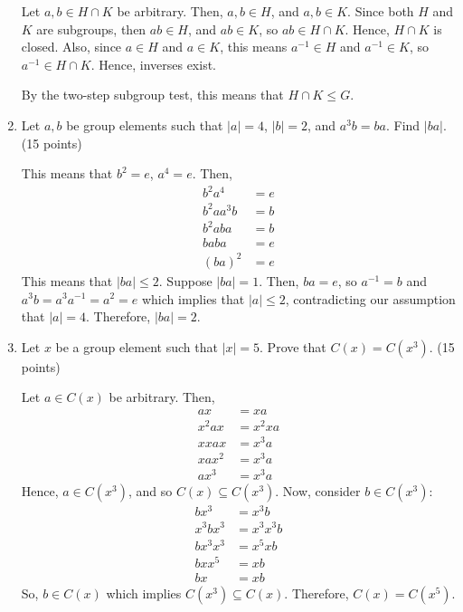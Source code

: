 \begin{enumerate}
    Let \(a, b\in H \cap K\) be arbitrary. Then, \(a,b \in H\), and \(a,b \in K\). Since both \(H\) and \(K\) are subgroups, then \(ab \in H\), and \(ab \in K\), so \(ab \in H \cap K\). Hence, \(H \cap K\) is closed. Also, since \(a \in H\) and \(a \in K\), this means \(a^{-1} \in H\) and \(a^{-1} \in K\), so \(a^{-1} \in H \cap K\). Hence, inverses exist.

    By the two-step subgroup test, this means that \(H \cap K \leq G\).

    \item Let \(a, b\) be group elements such that \(|a| = 4\), \(|b| = 2\), and \(a^3 b = ba\). Find \(|ba|\). (15 points)

    This means that \(b^2 = e\), \(a^4 = e\). Then,
    \begin{align*}
        b^2 a^4 &= e \\
        b^2 aa^3 b &= b \\
        b^2 aba &= b \\
        baba &= e \\
        (ba)^2 &= e
    \end{align*}
    This means that \(|ba| \leq 2\). Suppose \(|ba| = 1\). Then, \(ba = e\), so \(a^{-1} = b\) and \(a^3 b = a^3 a^{-1} = a^2 = e\) which implies that \(|a| \leq 2\), contradicting our assumption that \(|a| = 4\). Therefore, \(|ba| = 2\).

    \item Let \(x\) be a group element such that \(|x| = 5\). Prove that \(C(x) = C(x^3)\). (15 points)

    Let \(a \in C(x)\) be arbitrary. Then,
    \begin{align*}
        ax &= xa \\
        x^2ax &= x^2xa \\
        xxax &= x^3 a \\
        xax^2 &= x^3 a \\
        ax^3 &= x^3 a
    \end{align*}
    Hence, \(a\in C(x^3)\), and so \(C(x) \subseteq C(x^3)\). Now, consider \(b \in C(x^3)\):
    \begin{align*}
        bx^3 &= x^3b \\
        x^3bx^3 &= x^3x^3b \\
        bx^3x^3 &= x^5xb \\
        bxx^5 &= xb \\
        bx &= xb
    \end{align*}
    So, \(b\in C(x)\) which implies \(C(x^3) \subseteq C(x)\). Therefore, \(C(x) = C(x^5)\).
\end{enumerate}